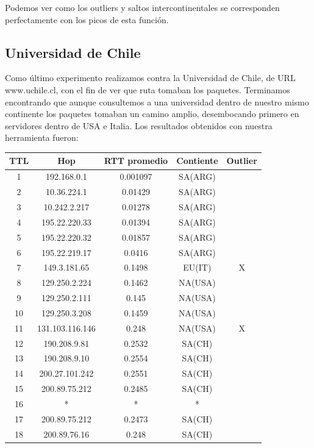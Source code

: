 \documentclass[a4paper,10pt]{article}
\begin{document}
\medskip
\par{Podemos ver como los outliers y saltos intercontinentales se corresponden perfectamente con los picos de esta función.}



\medskip
\medskip
\medskip


\subsection{Universidad de Chile}

\medskip
\par{Como último experimento realizamos contra la Universidad de Chile, de URL www.uchile.cl, con el fin de ver que ruta tomaban los paquetes. Terminamos encontrando que  aunque consultemos a una universidad dentro de nuestro mismo continente los paquetes tomaban un camino amplio, desembocando primero en servidores dentro de USA e Italia. Los resultados obtenidos con nuestra herramienta fueron: }

\medskip

\begin{center}
\begin{tabular}{|c | c | c || c | c |}
    \hline
    TTL & Hop & RTT promedio & Contiente & Outlier \\ \hline
1 & 192.168.0.1 & 0.001097& SA(ARG) &   \\ \hline
2 & 10.36.224.1 & 0.01429& SA(ARG) &   \\ \hline
3 & 10.242.2.217 & 0.01278& SA(ARG) &   \\ \hline
4 & 195.22.220.33 & 0.01394& SA(ARG) &   \\ \hline
5 & 195.22.220.32 & 0.01857& SA(ARG) &   \\ \hline
6 & 195.22.219.17 & 0.0416& SA(ARG) &   \\ \hline
7 & 149.3.181.65 & 0.1498& EU(IT) & X \\ \hline
8 & 129.250.2.224 & 0.1462& NA(USA) &   \\ \hline
9 & 129.250.2.111 & 0.145& NA(USA) &   \\ \hline
10 & 129.250.3.208 & 0.1459& NA(USA) &   \\ \hline
11 & 131.103.116.146 & 0.248& NA(USA) & X \\ \hline
12 & 190.208.9.81 & 0.2532& SA(CH) &   \\ \hline
13 & 190.208.9.10 & 0.2554& SA(CH) &   \\ \hline
14 & 200.27.101.242 & 0.2551& SA(CH) &   \\ \hline
15 & 200.89.75.212 & 0.2485& SA(CH) &   \\ \hline
16 & * & * & * &  \\ \hline
17 & 200.89.75.212 & 0.2473& SA(CH) &   \\ \hline
18 & 200.89.76.16 & 0.248& SA(CH) &   \\ \hline


\end{tabular}
\end{center}
\end{document}
